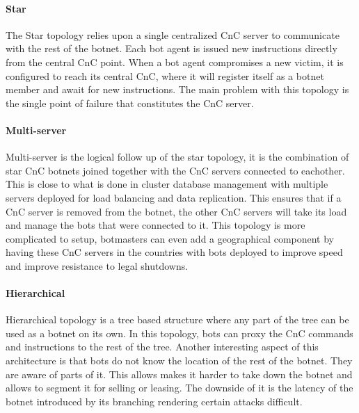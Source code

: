 \paragraph{Star}
The Star topology relies upon a single centralized CnC server to communicate with the rest of the botnet. Each bot agent is issued new instructions directly from the central CnC point. When a bot agent compromises a new victim, it is configured to reach its central CnC, where it will register itself as a botnet member and await for new instructions. The main problem with this topology is the single point of failure that constitutes the CnC server.


\paragraph{Multi-server}
Multi-server is the logical follow up of the star topology, it is the combination of star CnC botnets joined together with the CnC servers connected to eachother. This is close to what is done in cluster database management with multiple servers deployed for load balancing and data replication. This ensures that if a CnC server is removed from the botnet, the other CnC servers will take its load and manage the bots that were connected to it. This topology is more complicated to setup, botmasters can even add a geographical component by having these CnC servers in the countries with bots deployed to improve speed and improve resistance to legal shutdowns.

\paragraph{Hierarchical}
Hierarchical topology is a tree based structure where any part of the tree can be used as a botnet on its own. In this topology, bots can proxy the CnC commands and instructions to the rest of the tree. Another interesting aspect of this architecture is that bots do not know the location of the rest of the botnet. They are aware of parts of it. This allows makes it harder to take down the botnet and allows to segment it for selling or leasing. The downside of it is the latency of the botnet introduced by its branching rendering certain attacks difficult.

